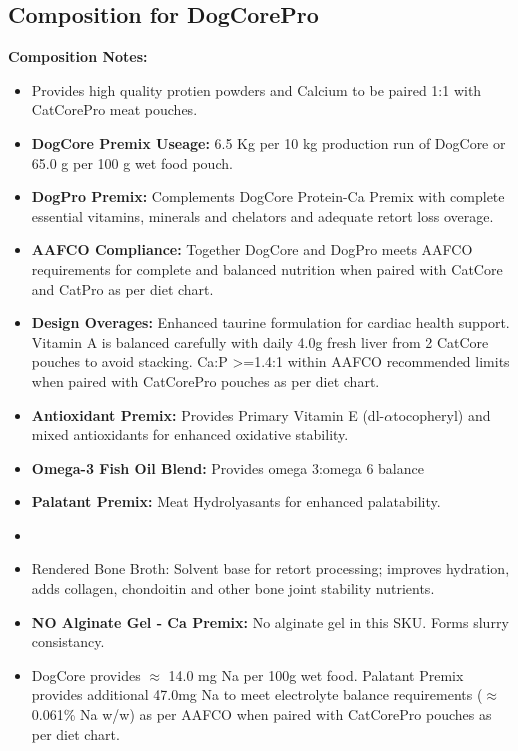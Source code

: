 \subsection*{Composition for DogCorePro}

\noindent\textbf{Composition Notes:}
\begin{itemize}
\item{} Provides high quality protien powders and Calcium to be paired 1:1 with CatCorePro meat pouches.
\item \textbf{DogCore Premix Useage: }6.5 Kg per 10 kg production run of DogCore or 65.0 g per 100 g wet food pouch.
\item \textbf{DogPro Premix: } Complements DogCore Protein-Ca Premix with complete essential vitamins, minerals and chelators and adequate retort loss overage. 
\item\textbf{AAFCO Compliance: } Together DogCore and DogPro meets AAFCO requirements for complete and balanced nutrition when paired with CatCore and CatPro as per diet chart. 
\item\textbf{Design Overages: }Enhanced taurine formulation for cardiac health support. Vitamin A is balanced carefully with daily 4.0g fresh liver from 2 CatCore pouches to avoid stacking. Ca:P >=1.4:1 within AAFCO recommended limits when paired with CatCorePro pouches as per diet chart. 
\item \textbf{Antioxidant Premix: } Provides Primary Vitamin E (dl-$\alpha$tocopheryl) and mixed antioxidants for enhanced oxidative stability.
\item \textbf{Omega-3 Fish Oil Blend:} Provides omega 3:omega 6  balance
\item \textbf{Palatant Premix: } Meat Hydrolyasants for enhanced palatability.
\item\item{Rendered Bone Broth: } Solvent base for retort processing; improves hydration, adds collagen, chondoitin and other bone joint stability nutrients. 
\item \textbf{NO Alginate Gel - Ca Premix:} No alginate gel in this SKU. Forms slurry consistancy. 
\item {} DogCore provides $\approx$ 14.0 mg Na per 100g wet food. Palatant Premix provides additional 47.0mg Na to meet electrolyte balance requirements ($\approx$ 0.061\% Na w/w) as per AAFCO when paired with CatCorePro pouches as per diet chart. 
\end{itemize}

